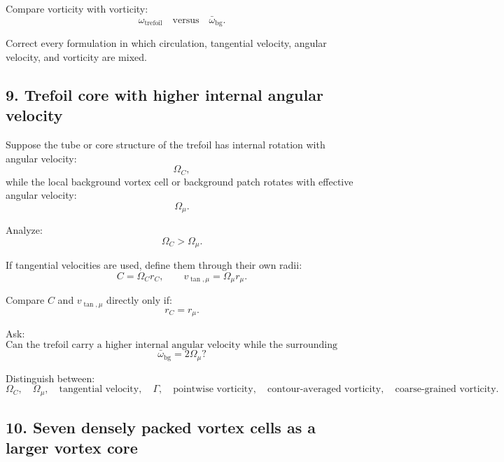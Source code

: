 \documentclass[11pt]{article}
\begin{document}
            Compare vorticity with vorticity:
            \[
                \omega_{\mathrm{trefoil}}
                \quad\text{versus}\quad
                \bar{\omega}_{\mathrm{bg}}.
            \]
            
            Correct every formulation in which circulation, tangential velocity, angular velocity, and vorticity are mixed.
        
        \subsection{9. Trefoil core with higher internal angular velocity}
            
            Suppose the tube or core structure of the trefoil has internal rotation with angular velocity:
            \[
                \Omega_C,
            \]
            while the local background vortex cell or background patch rotates with effective angular velocity:
            \[
                \Omega_{\mu}.
            \]
            
            Analyze:
            \[
                \Omega_C>\Omega_{\mu}.
            \]
            
            If tangential velocities are used, define them through their own radii:
            \[
                C=\Omega_C r_C,
                \qquad
                v_{\tan,\mu}=\Omega_{\mu}r_{\mu}.
            \]
            
            Compare \(C\) and \(v_{\tan,\mu}\) directly only if:
            \[
                r_C=r_{\mu}.
            \]
            
            Ask:
            \[
                \text{Can the trefoil carry a higher internal angular velocity while the surrounding coarse-grained background vorticity remains}
            \]
            \[
                \bar{\omega}_{\mathrm{bg}}=2\Omega_{\mu}?
            \]
            
            Distinguish between:
            \[
                \Omega_C,
                \quad
                \Omega_{\mu},
                \quad
                \text{tangential velocity},
                \quad
                \Gamma,
                \quad
                \text{pointwise vorticity},
                \quad
                \text{contour-averaged vorticity},
                \quad
                \text{coarse-grained vorticity}.
            \]
        
        \subsection{10. Seven densely packed vortex cells as a larger vortex core}
            
\end{document}
